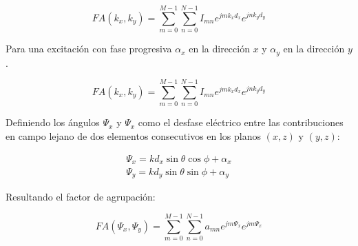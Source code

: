 \begin{equation}
	FA (k_{x},k_{y}) =\sum_{m=0}^{M-1} \sum_{n=0}^{N-1} I_{mn}e^{jmk_{x}d_{x}}e^{jnk_{y}d_{y}}
	\label{eq:fabinom}
\end{equation}

\par Para una excitación con fase progresiva $\alpha_{x}$ en la dirección $x$ y $\alpha_{y}$ en la dirección $y$. 

\begin{equation}
	FA (k_{x},k_{y}) =\sum_{m=0}^{M-1} \sum_{n=0}^{N-1} I_{mn}e^{jmk_{x}d_{x}}e^{jnk_{y}d_{y}}
	\label{eq:excitbinom}
\end{equation}

\par Definiendo los ángulos $\Psi_{x}$ y $\Psi_{x}$ como el desfase eléctrico entre las contribuciones en campo lejano de dos elementos consecutivos en los planos $(x,z)$ y $(y,z)$: 

\begin{equation}
	\begin{matrix}
\Psi_{x}=kd_{x}\sin\theta\cos\phi+\alpha_{x}
 \\
\Psi_{y}=kd_{y}\sin\theta\sin\phi+\alpha_{y}
\end{matrix}
	\label{eq:sinsin}
\end{equation}

\par Resultando el factor de agrupación: 

\begin{equation}
	FA (\Psi_{x},\Psi_{y}) =\sum_{m=0}^{M-1} \sum_{n=0}^{N-1} a_{mn}e^{jm\Psi_{x}}e^{jm\Psi_{x}}
	\label{eq:fatipo2}
\end{equation}


